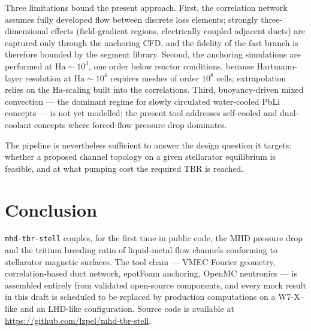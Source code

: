 \documentclass{article}
\newcommand{\Ha}{\mathrm{Ha}}
\begin{document}
Three limitations bound the present approach. First, the correlation network assumes
fully developed flow between discrete loss elements; strongly three-dimensional
effects (field-gradient regions, electrically coupled adjacent ducts) are captured
only through the anchoring CFD, and the fidelity of the fast branch is therefore
bounded by the segment library. Second, the anchoring simulations are performed at
$\Ha \sim 10^3$, one order below reactor conditions, because Hartmann-layer
resolution at $\Ha \sim 10^4$ requires meshes of order $10^8$ cells; extrapolation
relies on the $\Ha$-scaling built into the correlations. Third, buoyancy-driven
mixed convection --- the dominant regime for slowly circulated water-cooled PbLi
concepts --- is not yet modelled; the present tool addresses self-cooled and
dual-coolant concepts where forced-flow pressure drop dominates.

The pipeline is nevertheless sufficient to answer the design question it targets:
whether a proposed channel topology on a given stellarator equilibrium is feasible,
and at what pumping cost the required TBR is reached.

\section{Conclusion}

\texttt{mhd-tbr-stell} couples, for the first time in public code, the MHD
pressure drop and the tritium breeding ratio of liquid-metal flow channels
conforming to stellarator magnetic surfaces. The tool chain --- VMEC Fourier
geometry, correlation-based duct network, epotFoam anchoring, OpenMC neutronics ---
is assembled entirely from validated open-source components, and every mock result
in this draft is scheduled to be replaced by production computations on a W7-X--like
and an LHD-like configuration. Source code is available at
\url{https://github.com/lzpel/mhd-tbr-stell}.



\end{document}
